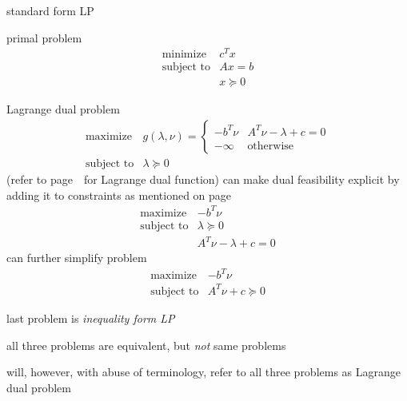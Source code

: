 \documentclass[17pt,landscape]{foils}
\begin{document}
{

\bit
\item
	standard form LP
	\bit
	\item
		primal problem
		$$
			\begin{array}{ll}
				\mbox{minimize} &
					c^Tx
				\\
				\mbox{subject to} &
					Ax = b
				\\ &
					x\succeq 0
			\end{array}
		$$
	\item
		Lagrange dual problem
		$$
			\begin{array}{ll}
				\mbox{maximize} &
					g(\lambda,\nu) = \left\{\begin{array}{ll}
						-b^T\nu & A^T\nu - \lambda + c = 0
						\\
						-\infty & \mbox{otherwise}
					\end{array}\right.
				\\
				\mbox{subject to} &
					\lambda \succeq 0
			\end{array}
		$$
		(refer to page~\pageref{page:dual function of standard form LP}\
			for Lagrange dual function)
		\bit
		\iitem
			can make dual feasibility explicit by adding it to constraints
			as mentioned on page~\pageref{page:make implicit dual feasibility explicit}\
			$$
				\begin{array}{ll}
					\mbox{maximize} &
						-b^T\nu
					\\
					\mbox{subject to} &
						\lambda \succeq 0
					\\ &
						A^T\nu - \lambda + c = 0
				\end{array}
			$$
		\iitem
			can further simplify problem
			$$
				\begin{array}{ll}
					\mbox{maximize} &
						-b^T\nu
					\\
					\mbox{subject to} &
						A^T\nu + c \succeq 0
				\end{array}
			$$
		\eit
	\item
		last problem is \emph{inequality form LP}
	\item
		all three problems are equivalent,
		but \emph{not} same problems

	\item
		will, however, with abuse of terminology,
		refer to all three problems
		as Lagrange dual problem
	\eit

}
\end{document}
